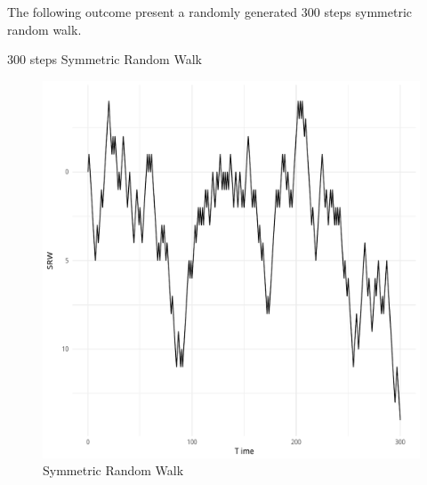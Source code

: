 \documentclass{article}\usepackage[]{graphicx}\usepackage[]{color}
\newenvironment{knitrout}{}{} %
\begin{document}
The following outcome present a randomly generated 300 steps symmetric random walk.

\begin{table}[h]

\caption{300 steps Symmetric Random Walk}
\end{table}


\begin{figure}[!ht]
\begin{center}

\begin{knitrout}
\color{fgcolor}
\includegraphics[width=1\linewidth]{figure/unnamed-chunk-4-1} 

\end{knitrout}


\end{center}
\caption{Symmetric Random Walk}
\end{figure}
\end{document}
